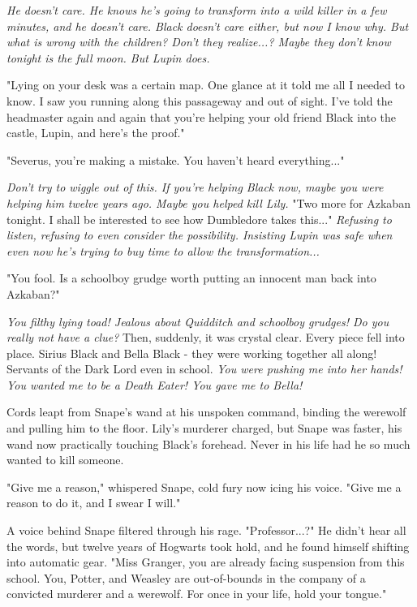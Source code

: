\emph{He doesn't care. He knows he's going to transform into a wild killer in a few minutes, and he doesn't care. Black doesn't care either, but now I know why. But what is wrong with the children? Don't they realize...? Maybe they don't know tonight is the full moon. But Lupin does.}

"Lying on your desk was a certain map. One glance at it told me all I needed to know. I saw you running along this passageway and out of sight. I've told the headmaster again and again that you're helping your old friend Black into the castle, Lupin, and here's the proof."

"Severus, you're making a mistake. You haven't heard everything..."

\emph{Don't try to wiggle out of this. If you're helping Black now, maybe you were helping him twelve years ago. Maybe you helped kill Lily.} "Two more for Azkaban tonight. I shall be interested to see how Dumbledore takes this..." \emph{Refusing to listen, refusing to even consider the possibility. Insisting Lupin was safe when even now he's trying to buy time to allow the transformation...}

"You fool. Is a schoolboy grudge worth putting an innocent man back into Azkaban?"

\emph{You filthy lying toad! Jealous about Quidditch and schoolboy grudges! Do you really not have a clue?} Then, suddenly, it was crystal clear. Every piece fell into place. Sirius Black and Bella Black - they were working together all along! Servants of the Dark Lord even in school. \emph{You were pushing me into her hands! You wanted me to be a Death Eater! You gave me to Bella!}

Cords leapt from Snape's wand at his unspoken command, binding the werewolf and pulling him to the floor. Lily's murderer charged, but Snape was faster, his wand now practically touching Black's forehead. Never in his life had he so much wanted to kill someone.

"Give me a reason," whispered Snape, cold fury now icing his voice. "Give me a reason to do it, and I swear I will."

A voice behind Snape filtered through his rage. "Professor...?" He didn't hear all the words, but twelve years of Hogwarts took hold, and he found himself shifting into automatic gear. "Miss Granger, you are already facing suspension from this school. You, Potter, and Weasley are out-of-bounds in the company of a convicted murderer and a werewolf. For once in your life, hold your tongue."

